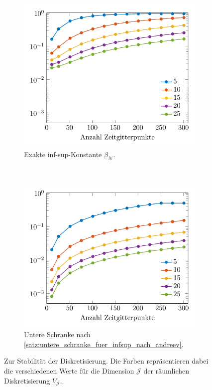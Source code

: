 \documentclass[../main.tex]{subfiles}
\begin{document}
\begin{figure}[tb]
    \centering
    \centering
    \begin{subfigure}[b]{0.485\textwidth}
        \centering
        \includegraphics[width=1\textwidth]{figures/chapter4/stability_sine_dataset1_fig_1.pdf}
        \caption{Exakte inf-sup-Konstante $\beta_{\mathcal N}$.}
    \end{subfigure}
    ~
    \begin{subfigure}[b]{0.485\textwidth}
        \centering
        \includegraphics[width=1\textwidth]{figures/chapter4/stability_sine_dataset1_fig_2.pdf}
        \caption{Untere Schranke nach \cref{satz:untere_schranke_fuer_infsup_nach_andreev}.}
    \end{subfigure}
    \caption[Stabilität der Diskretisierung mit homogenen Randbedingungen, erstes Beispiel.]{%
        Zur Stabilität der Diskretisierung.
        Die Farben repräsentieren dabei die verschiedenen Werte für die Dimension $\mathcal J$ der räumlichen Diskretisierung $V_{\mathcal J}$.
        }
    \label{figure:infsup_homogen_ein_feld}
\end{figure}
\end{document}
